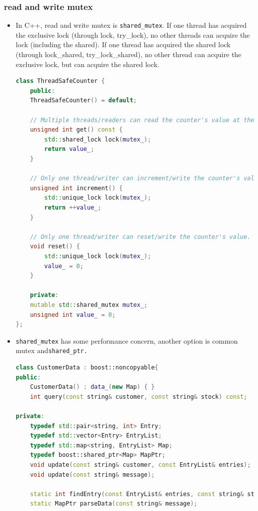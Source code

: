 \documentclass[a4paper,11pt,twoside]{book}
\begin{document}
\subsubsection{read and write mutex}

\begin{itemize}

    \item In C++, read and write mutex is \texttt{shared\_mutex}. If one thread has acquired the exclusive lock (through lock, try\_lock), no other threads can acquire the lock (including the shared). If one thread has acquired the shared lock (through lock\_shared, try\_lock\_shared), no other thread can acquire the exclusive lock, but can acquire the shared lock.

\begin{lstlisting}[frame=single, language=c++]	
class ThreadSafeCounter {
	public:
	ThreadSafeCounter() = default;
	
	// Multiple threads/readers can read the counter's value at the same time.
	unsigned int get() const {
		std::shared_lock lock(mutex_);
		return value_;
	}
	
	// Only one thread/writer can increment/write the counter's value.
	unsigned int increment() {
		std::unique_lock lock(mutex_);
		return ++value_;
	}
	
	// Only one thread/writer can reset/write the counter's value.
	void reset() {
		std::unique_lock lock(mutex_);
		value_ = 0;
	}
	
	private:
	mutable std::shared_mutex mutex_;
	unsigned int value_ = 0;
};	
\end{lstlisting}

    \item \texttt{shared\_mutex} has some performance concern, another option is common mutex and\texttt{shared\_ptr.} 

\begin{lstlisting}[frame=single, language=c++]	
class CustomerData : boost::noncopyable{
public:
	CustomerData() : data_(new Map) { }
	int query(const string& customer, const string& stock) const;
	
private:
	typedef std::pair<string, int> Entry;
	typedef std::vector<Entry> EntryList;
	typedef std::map<string, EntryList> Map;
	typedef boost::shared_ptr<Map> MapPtr;
	void update(const string& customer, const EntryList& entries);
	void update(const string& message);
	
	static int findEntry(const EntryList& entries, const string& stock);
	static MapPtr parseData(const string& message);
	

\end{lstlisting}
\end{itemize}
\end{document}
